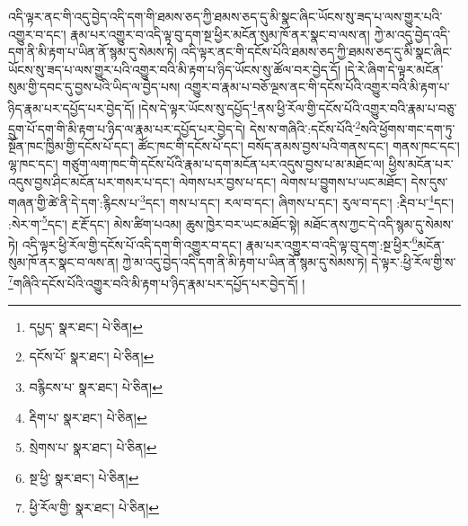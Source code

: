 འདི་ལྟར་ནང་གི་འདུ་བྱེད་འདི་དག་གི་ཐམས་ཅད་ཀྱི་ཐམས་ཅད་དུ་མི་སྣང་ཞིང་ཡོངས་སུ་ཟད་པ་ལས་གྱུར་པའི་འགྱུར་བ་དང་། རྣམ་པར་འགྱུར་བ་འདི་ལྟ་བུ་དག་སྔ་ཕྱིར་མངོན་སུམ་ཁོ་ནར་སྣང་བ་ལས་ན། ཀྱེ་མ་འདུ་བྱེད་འདི་དག་ནི་མི་རྟག་པ་ཡིན་ནོ་སྙམ་དུ་སེམས་ཏེ། འདི་ལྟར་ནང་གི་དངོས་པོའི་ཐམས་ཅད་ཀྱི་ཐམས་ཅད་དུ་མི་སྣང་ཞིང་ཡོངས་སུ་ཟད་པ་ལས་གྱུར་པའི་འགྱུར་བའི་མི་རྟག་པ་ཉིད་ཡོངས་སུ་ཚོལ་བར་བྱེད་དོ། །དེ་རེ་ཞིག་དེ་ལྟར་མངོན་སུམ་གྱི་དབང་དུ་བྱས་པའི་ཡིད་ལ་བྱེད་པས། འགྱུར་བ་རྣམ་པ་བཅོ་ལྔས་ནང་གི་དངོས་པོའི་འགྱུར་བའི་མི་རྟག་པ་ཉིད་རྣམ་པར་དཔྱོད་པར་བྱེད་དོ། །དེས་དེ་ལྟར་ཡོངས་སུ་དཔྱོད་\footnote{དཔྱད་  སྣར་ཐང་།  པེ་ཅིན། }ནས་ཕྱི་རོལ་གྱི་དངོས་པོའི་འགྱུར་བའི་རྣམ་པ་བཅུ་དྲུག་པོ་དག་གི་མི་རྟག་པ་ཉིད་ལ་རྣམ་པར་དཔྱོད་པར་བྱེད་དེ། དེས་ས་གཞིའི་:དངོས་པོའི་\footnote{དངོས་པོ་  སྣར་ཐང་།  པེ་ཅིན། }སའི་ཕྱོགས་གང་དག་ཏུ་སྔོན་ཁང་ཁྱིམ་གྱི་དངོས་པོ་དང་། ཚོང་ཁང་གི་དངོས་པོ་དང་། བསོད་ནམས་བྱས་པའི་གནས་དང་། གནས་ཁང་དང་། ལྷ་ཁང་དང་། གཙུག་ལག་ཁང་གི་དངོས་པོའི་རྣམ་པ་དག་མངོན་པར་འདུས་བྱས་པ་མ་མཐོང་ལ། ཕྱིས་མངོན་པར་འདུས་བྱས་ཤིང་མངོན་པར་གསར་པ་དང་། ལེགས་པར་བྱས་པ་དང་། ལེགས་པ་བྱུགས་པ་ཡང་མཐོང་། དེས་དུས་གཞན་གྱི་ཚེ་ནི་དེ་དག་:རྙིངས་པ་\footnote{བརྙིངས་པ་  སྣར་ཐང་།  པེ་ཅིན། }དང་། གས་པ་དང་། རལ་བ་དང་། ཞིགས་པ་དང་། རུལ་བ་དང་། :རྡིབ་པ་\footnote{རྡིག་པ་  སྣར་ཐང་།  པེ་ཅིན། }དང་། :སེར་ག་\footnote{སྲེགས་པ་  སྣར་ཐང་།  པེ་ཅིན། }དང་། རྔ་རྔོ་དང་། མེས་ཚིག་པའམ། ཆུས་ཁྱེར་བར་ཡང་མཐོང་སྟེ། མཐོང་ནས་ཀྱང་དེ་འདི་སྙམ་དུ་སེམས་ཏེ། འདི་ལྟར་ཕྱི་རོལ་གྱི་དངོས་པོ་འདི་དག་གི་འགྱུར་བ་དང་། རྣམ་པར་འགྱུར་བ་འདི་ལྟ་བུ་དག་:སྔ་ཕྱིར་\footnote{སྔ་ཕྱི་  སྣར་ཐང་།  པེ་ཅིན། }མངོན་སུམ་ཁོ་ནར་སྣང་བ་ལས་ན། ཀྱེ་མ་འདུ་བྱེད་འདི་དག་ནི་མི་རྟག་པ་ཡིན་ནོ་སྙམ་དུ་སེམས་ཏེ། དེ་ལྟར་:ཕྱི་རོལ་གྱི་ས་\footnote{ཕྱི་རོལ་གྱི་  སྣར་ཐང་།  པེ་ཅིན། }གཞིའི་དངོས་པོའི་འགྱུར་བའི་མི་རྟག་པ་ཉིད་རྣམ་པར་དཔྱོད་པར་བྱེད་དོ། །
